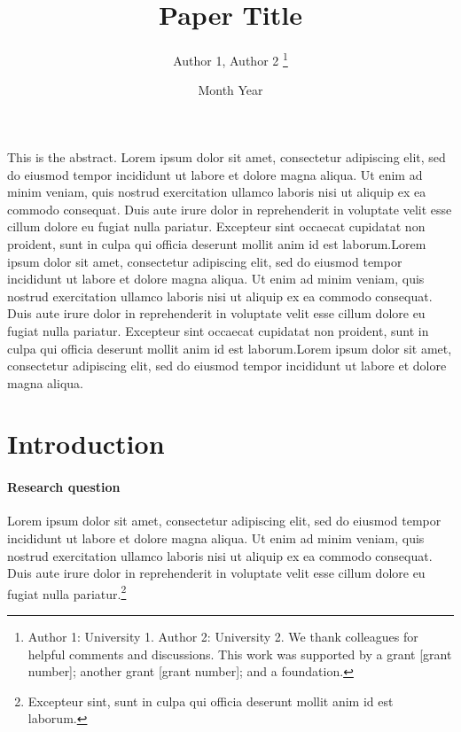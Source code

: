 \documentclass[letterpaper,12pt,leqno]{article}
\begin{document}
\title{Paper Title}
\author{Author 1, Author 2
\thanks{Author 1: University 1. Author 2: University 2. We thank colleagues for helpful comments and discussions. This work was supported by a grant [grant number]; another grant [grant number]; and a foundation.}}
\date{Month Year}                       
\begin{titlepage}\maketitle

This is the abstract. Lorem ipsum dolor sit amet, consectetur adipiscing elit, sed do eiusmod tempor incididunt ut labore et dolore magna aliqua. Ut enim ad minim veniam, quis nostrud exercitation ullamco laboris nisi ut aliquip ex ea commodo consequat. Duis aute irure dolor in reprehenderit in voluptate velit esse cillum dolore eu fugiat nulla pariatur. Excepteur sint occaecat cupidatat non proident, sunt in culpa qui officia deserunt mollit anim id est laborum.Lorem ipsum dolor sit amet, consectetur adipiscing elit, sed do eiusmod tempor incididunt ut labore et dolore magna aliqua. Ut enim ad minim veniam, quis nostrud exercitation ullamco laboris nisi ut aliquip ex ea commodo consequat. Duis aute irure dolor in reprehenderit in voluptate velit esse cillum dolore eu fugiat nulla pariatur. Excepteur sint occaecat cupidatat non proident, sunt in culpa qui officia deserunt mollit anim id est laborum.Lorem ipsum dolor sit amet, consectetur adipiscing elit, sed do eiusmod tempor incididunt ut labore et dolore magna aliqua.

\end{titlepage}\section{Introduction}\label{s:introduction}
 
\paragraph{Research question} Lorem ipsum dolor sit amet, consectetur adipiscing elit, sed do eiusmod tempor incididunt ut labore et dolore magna aliqua. Ut enim ad minim veniam, quis nostrud exercitation ullamco laboris nisi ut aliquip ex ea commodo consequat. Duis aute irure dolor in reprehenderit in voluptate velit esse cillum dolore eu fugiat nulla pariatur.\footnote{Excepteur sint, sunt in culpa qui officia deserunt mollit anim id est laborum.}
\end{document}
